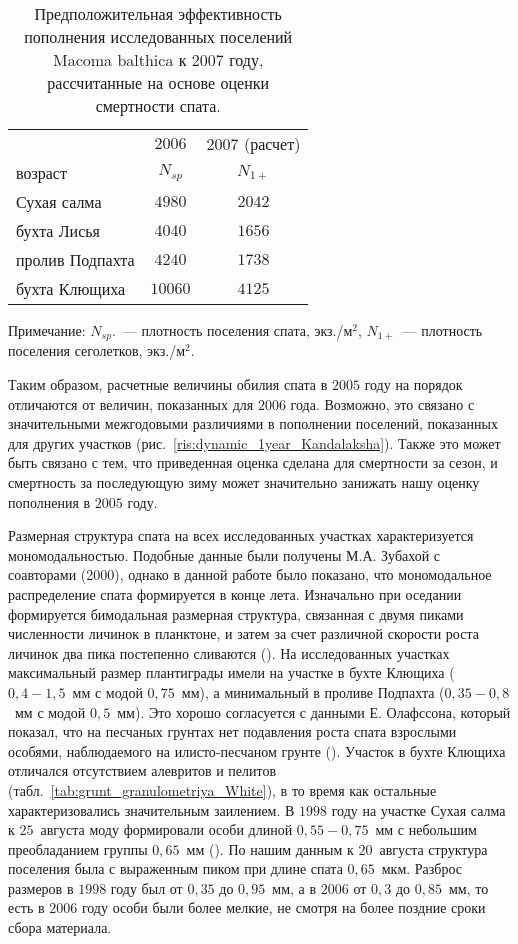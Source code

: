 \begin{table}[p]
\caption{Предположительная эффективность пополнения исследованных поселений Macoma balthica к 2007 году, рассчитанные на основе оценки смертности спата.}
\label{tab:N1_rasschet}
\begin{center}
\begin{tabular}{|l|c|c|}
\hline
                & $2006$  & $2007$ (расчет) \\
возраст         & $N_{sp}$      & $N_{1+}$  \\ \hline
Сухая салма     & $4980$  & $2042$          \\ \hline
бухта Лисья     & $4040$  & $1656$          \\ \hline
пролив Подпахта & $4240$  & $1738$          \\ \hline
бухта Клющиха   & $10060$ & $4125$         \\ \hline
\end{tabular}
\end{center}
	\footnotesize{Примечание: $N_{sp}$.~--- плотность поселения спата, экз./м$^2$, $N_{1+}$~--- плотность поселения сеголетков, экз./м$^2$.}
\end{table}

Таким образом, расчетные величины обилия спата в $2005$ году на порядок отличаются от величин, показанных для $2006$ года. 
Возможно, это связано с значительными межгодовыми различиями в пополнении поселений, показанных для других участков (рис.~\ref{ris:dynamic_1year_Kandalaksha}). 
Также это может быть связано с тем, что приведенная оценка сделана для смертности за сезон, и смертность за последующую зиму может значительно занижать нашу оценку пополнения в $2005$ году. 

Размерная структура спата на всех исследованных участках характеризуется мономодальностью. 
Подобные данные были получены М.А. Зубахой с соавторами (2000), однако в данной работе было показано, что мономодальное распределение спата формируется в конце лета. 
Изначально при оседании формируется бимодальная размерная структура, связанная с двумя пиками численности личинок в планктоне, и затем за счет различной скорости роста личинок два пика постепенно сливаются (\cite{Zubakha_et_al_2000}).
На исследованных участках максимальный размер плантиграды имели на участке в бухте Клющиха ($0,4 - 1,5$~мм с модой $0,75$~мм), а минимальный в проливе Подпахта ($0,35 - 0,8$~мм с модой $0,5$~мм). 
Это хорошо согласуется с данными Е. Олафссона, который показал, что на песчаных грунтах нет подавления роста спата взрослыми особями, наблюдаемого на илисто-песчаном грунте (\cite{Olafsson_1989}). 
Участок в бухте Клющиха отличался отсутствием алевритов и пелитов (табл.~\ref{tab:grunt_granulometriya_White}), в то время как остальные характеризовались значительным заилением. 
В $1998$ году на участке Сухая салма к $25$~августа моду формировали особи длиной $0,55 - 0,75$~мм с небольшим преобладанием группы $0,65$~мм (\cite{Zubakha_et_al_2000}). 
По нашим данным к $20$~августа структура поселения была с выраженным пиком при длине спата $0,65$~мкм. 
Разброс размеров в $1998$ году был от $0,35$ до $0,95$~мм, а в $2006$ от $0,3$ до $0,85$~мм, то есть в $2006$ году особи были более мелкие, не смотря на более поздние сроки сбора материала. 


